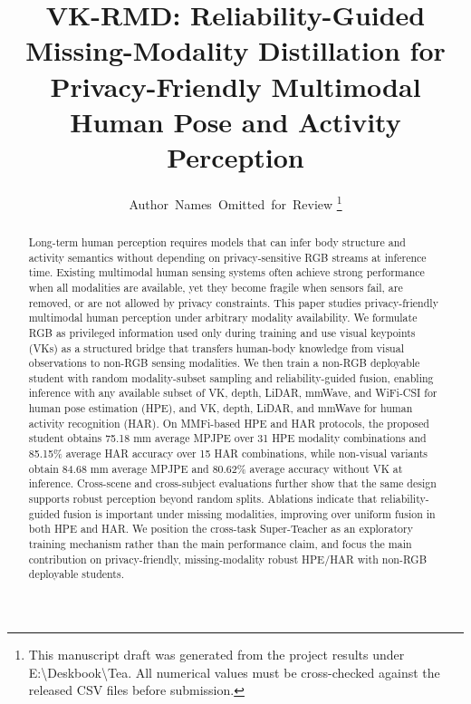 \documentclass[journal]{IEEEtran}
\newcommand{\ours}{VK-RMD}
\newcommand{\mpjpe}{MPJPE}
\begin{document}
\title{\ours: Reliability-Guided Missing-Modality Distillation for Privacy-Friendly Multimodal Human Pose and Activity Perception}

\author{Author~Names~Omitted~for~Review%
\thanks{This manuscript draft was generated from the project results under E:\textbackslash Deskbook\textbackslash Tea. All numerical values must be cross-checked against the released CSV files before submission.}}


\maketitle

\begin{abstract}
Long-term human perception requires models that can infer body structure and activity semantics without depending on privacy-sensitive RGB streams at inference time. Existing multimodal human sensing systems often achieve strong performance when all modalities are available, yet they become fragile when sensors fail, are removed, or are not allowed by privacy constraints. This paper studies privacy-friendly multimodal human perception under arbitrary modality availability. We formulate RGB as privileged information used only during training and use visual keypoints (VKs) as a structured bridge that transfers human-body knowledge from visual observations to non-RGB sensing modalities. We then train a non-RGB deployable student with random modality-subset sampling and reliability-guided fusion, enabling inference with any available subset of VK, depth, LiDAR, mmWave, and WiFi-CSI for human pose estimation (HPE), and VK, depth, LiDAR, and mmWave for human activity recognition (HAR). On MMFi-based HPE and HAR protocols, the proposed student obtains 75.18 mm average \mpjpe{} over 31 HPE modality combinations and 85.15\% average HAR accuracy over 15 HAR combinations, while non-visual variants obtain 84.68 mm average \mpjpe{} and 80.62\% average accuracy without VK at inference. Cross-scene and cross-subject evaluations further show that the same design supports robust perception beyond random splits. Ablations indicate that reliability-guided fusion is important under missing modalities, improving over uniform fusion in both HPE and HAR. We position the cross-task Super-Teacher as an exploratory training mechanism rather than the main performance claim, and focus the main contribution on privacy-friendly, missing-modality robust HPE/HAR with non-RGB deployable students.
\end{abstract}
\end{document}
